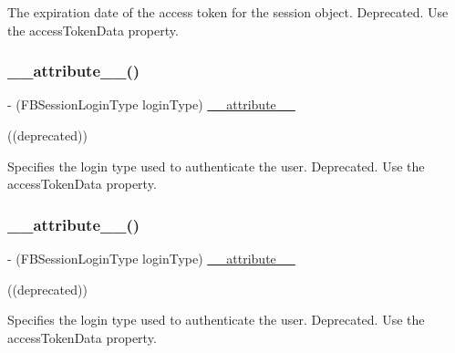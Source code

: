 The expiration date of the access token for the session object.  Deprecated. Use the {\ttfamily access\+Token\+Data} property. \mbox{\label{interfaceFBSession_acd3c247502e2514d93ccf123ad4824f8}} 
\subsubsection{\texorpdfstring{\+\_\+\+\_\+attribute\+\_\+\+\_\+()}{\_\_attribute\_\_()}\hspace{0.1cm}{\footnotesize\ttfamily [11/25]}}
{\footnotesize\ttfamily -\/ (F\+B\+Session\+Login\+Type login\+Type) \hyperlink{struct____attribute____}{\+\_\+\+\_\+attribute\+\_\+\+\_\+} \begin{DoxyParamCaption}\item[{((deprecated))}]{ }\end{DoxyParamCaption}}

Specifies the login type used to authenticate the user.  Deprecated. Use the {\ttfamily access\+Token\+Data} property. \mbox{\label{interfaceFBSession_acd3c247502e2514d93ccf123ad4824f8}} 
\subsubsection{\texorpdfstring{\+\_\+\+\_\+attribute\+\_\+\+\_\+()}{\_\_attribute\_\_()}\hspace{0.1cm}{\footnotesize\ttfamily [12/25]}}
{\footnotesize\ttfamily -\/ (F\+B\+Session\+Login\+Type login\+Type) \hyperlink{struct____attribute____}{\+\_\+\+\_\+attribute\+\_\+\+\_\+} \begin{DoxyParamCaption}\item[{((deprecated))}]{ }\end{DoxyParamCaption}}

Specifies the login type used to authenticate the user.  Deprecated. Use the {\ttfamily access\+Token\+Data} property. \mbox{\label{interfaceFBSession_acd3c247502e2514d93ccf123ad4824f8}} 
